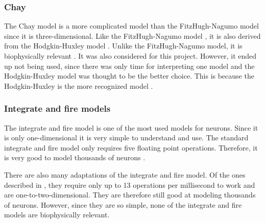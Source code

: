 \documentclass[class={myRUCProject}, crop=false]{standalone}
\begin{document}
\subsubsection*{Chay}
The Chay model is a more complicated model than the FitzHugh-Nagumo model since it is three-dimensional. Like the FitzHugh-Nagumo model \cite{Baladron2012}, it is also derived from the Hodgkin-Huxley model \cite{Shadizadeh2022}. Unlike the FitzHugh-Nagumo model, it is biophysically relevant \cite{gu2013biological}. It was also considered for this project. However, it ended up not being used, since there was only time for interpreting one model and the Hodgkin-Huxley model was thought to be the better choice. This is because the Hodgkin-Huxley is the more recognized model \cite{Izhikevich2004}.

\subsubsection*{Integrate and fire models}
The integrate and fire model is one of the most used models for neurons. Since it is only one-dimensional it is very simple to understand and use. The standard integrate and fire model only requires five floating point operations. Therefore, it is very good to model thousands of neurons \cite{Izhikevich2004}.

There are also many adaptations of the integrate and fire model. Of the ones described in \cite{Izhikevich2004}, they require only up to 13 operations per millisecond to work and are one-to-two-dimensional. They are therefore still good at modeling thousands of neurons. However, since they are so simple, none of the integrate and fire models are biophysically relevant.
\end{document}
